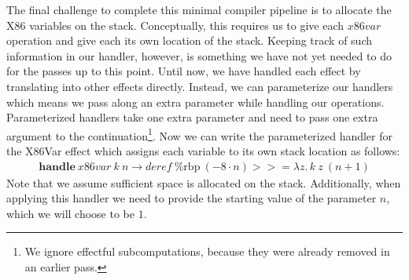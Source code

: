 \documentclass[a4paper,UKenglish,cleveref, autoref, thm-restate, anonymous]{oasics-v2021}
\newcommand\bind[1]{>\!\!>\!\!= \lambda #1.\,}
\begin{document}
The final challenge to complete this minimal compiler pipeline is to allocate the X86 variables on the stack.
Conceptually, this requires us to give each $\mathit{x86var}$ operation and give each its own location of the stack.
Keeping track of such information in our handler, however, is something we have not yet needed to do for the passes up to this point.
Until now, we have handled each effect by translating into other effects directly.
Instead, we can parameterize our handlers which means we pass along an extra parameter while handling our operations.
Parameterized handlers take one extra parameter and need to pass one extra argument to the continuation\footnote{We ignore effectful subcomputations, because they were already removed in an earlier pass.}. 
Now we can write the parameterized handler for the X86Var effect which assigns each variable to its own stack location as follows:
\begin{align*}
  \mathbf{handle}~\mathit{x86var}~k~n \to \mathit{deref}~\mathrm{\%rbp}~(-8 \cdot n) \bind{z} k~z~(n + 1)
\end{align*}
Note that we assume sufficient space is allocated on the stack.
Additionally, when applying this handler we need to provide the starting value of the parameter $n$, which we will choose to be $1$.
\end{document}
